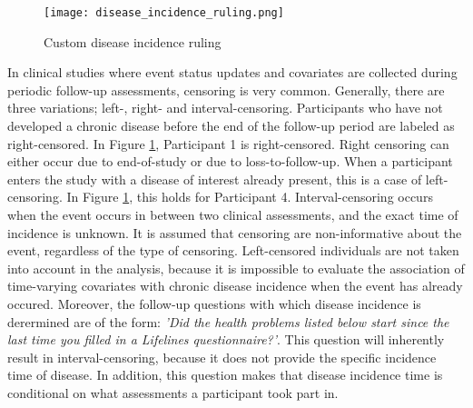 \begin{figure}[H]
    \centering
    \texttt{[image: disease\_incidence\_ruling.png]}
    \caption{Custom disease incidence ruling}
    \label{fig:data:disease_incidence_ruling}
  \end{figure}

In clinical studies where event status updates and covariates are collected during periodic follow-up assessments, censoring is very common. Generally, there are three variations; left-, right- and interval-censoring. Participants who have not developed a chronic disease before the end of the follow-up period are labeled as right-censored. In Figure \ref{fig:data:disease_incidence_ruling}, Participant 1 is right-censored. Right censoring can either occur due to end-of-study or due to loss-to-follow-up. When a participant enters the study with a disease of interest already present, this is a case of left-censoring. In Figure \ref{fig:data:disease_incidence_ruling}, this holds for Participant 4. Interval-censoring occurs when the event occurs in between two clinical assessments, and the exact time of incidence is unknown. It is assumed that censoring are non-informative about the event, regardless of the type of censoring. Left-censored individuals are not taken into account in the analysis, because it is impossible to evaluate the association of time-varying covariates with chronic disease incidence when the event has already occured. Moreover, the follow-up questions with which disease incidence is derermined are of the form: \textit{'Did the health problems listed below start since the last time you filled in a Lifelines questionnaire?'}. This question will inherently result in interval-censoring, because it does not provide the specific incidence time of disease. In addition, this question makes that disease incidence time is conditional on what assessments a participant took part in. 

